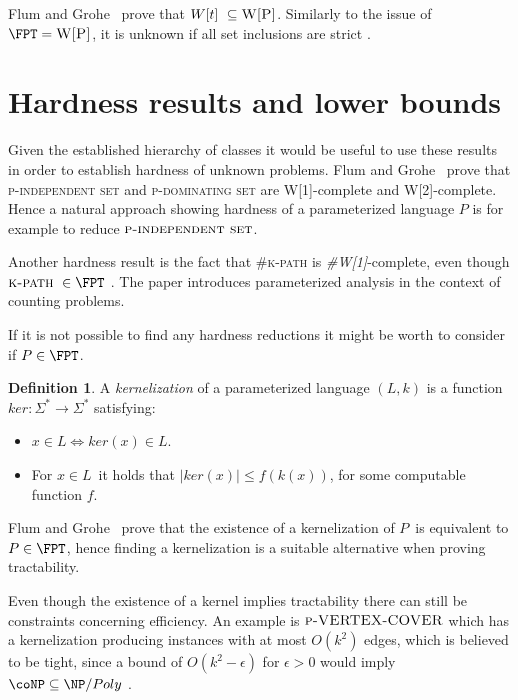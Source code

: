 \documentclass[a4paper,11pt]{report}
\theoremstyle{plain}
\theoremstyle{definition}
\newtheorem{defn}[thm]{Definition} %
\begin{document}
Flum and Grohe~\cite{FG06} prove that $W[t] \subseteq \textsc{W[P]}$.
Similarly to the issue of $\FPT = \textsc{W[P]}$, it is unknown if all set inclusions are strict \cite{FG06}.

\section{Hardness results and lower bounds}
Given the established hierarchy of classes it would be useful to use these results in order to establish hardness of unknown problems.
Flum and Grohe~\cite{FG06} prove that \textsc{p-independent set} and \textsc{p-dominating set} are \textsc{W[1]}-complete and \textsc{W[2]}-complete.
Hence a natural approach showing hardness of a parameterized language $P$ is for example to reduce $\textsc{p-independent set}$.

Another hardness result is the fact that \textsc{\#k-path} is \emph{\#W[1]}-complete, even though $\textsc{k-path} \in \FPT$ \cite{FG04}.
The paper introduces parameterized analysis in the context of counting problems.

If it is not possible to find any hardness reductions it might be worth to consider if $P \in \FPT$.

\begin{defn}
A \emph{kernelization} of a parameterized language $(L, k)$ is a function $ker : \Sigma^* \rightarrow \Sigma^*$ satisfying:
\begin{itemize}
\item $x \in L \Leftrightarrow ker(x) \in L$.
\item For $x \in L$ it holds that $|ker(x)| \leq f(k(x))$, for some computable function $f$.
\end{itemize}
\end{defn}

Flum and Grohe~\cite{FG06} prove that the existence of a kernelization of $P$ is equivalent to $P \in \FPT$, hence finding a kernelization is a suitable alternative when proving tractability.

Even though the existence of a kernel implies tractability there can still be constraints concerning efficiency.
An example is $\textsc{p-VERTEX-COVER}$ which has a kernelization producing instances with at most $O(k^2)$ edges, which is believed to be tight, since a bound of $O(k^2 - \epsilon)$ for $\epsilon > 0$
would imply $\coNP \subseteq \NP /Poly$ \cite{DELL10}.

\end{document}
